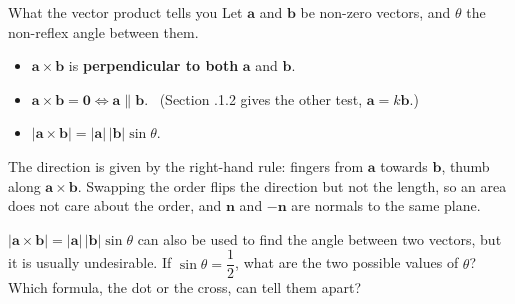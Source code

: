 \begin{definition}{What the vector product tells you}
Let $\mathbf{a}$ and $\mathbf{b}$ be non-zero vectors, and $\theta$ the non-reflex angle between them.
\begin{itemize}
  \item $\mathbf{a}\times\mathbf{b}$ is \textbf{perpendicular to both} $\mathbf{a}$ and $\mathbf{b}$.
  \item $\mathbf{a}\times\mathbf{b} = \mathbf{0} \iff \mathbf{a}\parallel\mathbf{b}$. \ (Section \chapnum.1.2 gives the other test, $\mathbf{a} = k\mathbf{b}$.)
  \item $|\mathbf{a}\times\mathbf{b}| = |\mathbf{a}|\,|\mathbf{b}|\sin\theta$.
\end{itemize}
\end{definition}

\begin{center}
\end{center}
The direction is given by the right-hand rule: fingers from $\mathbf{a}$ towards $\mathbf{b}$, thumb along $\mathbf{a}\times\mathbf{b}$. Swapping the order flips the direction but not the length, so an area does not care about the order, and $\mathbf{n}$ and $-\mathbf{n}$ are normals to the same plane.

\begin{question}
$|\mathbf{a}\times\mathbf{b}| = |\mathbf{a}|\,|\mathbf{b}|\sin\theta$ can also be used to find the angle between two vectors, but it is usually undesirable. If $\sin\theta = \dfrac{1}{2}$, what are the two possible values of $\theta$? Which formula, the dot or the cross, can tell them apart?
\end{question}

